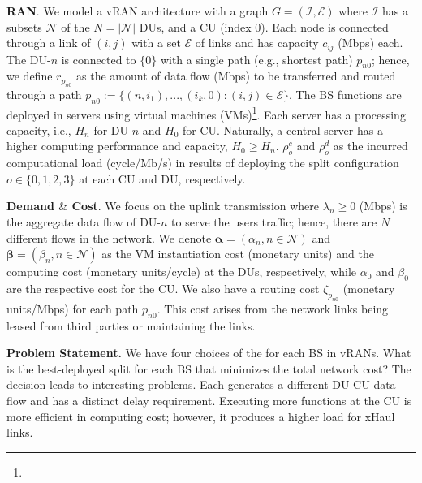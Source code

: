 \textbf{RAN}. We model a vRAN architecture with a graph $G = (\mathcal{I}, \mathcal{E})$ where $\mathcal{I}$ has a subsets $\mathcal{N}$ of the $N=|\mathcal{N}|$ DUs,  and a CU (index $0$). Each node is connected through a link of $(i,j)$ with a set $\mathcal{E}$ of links and has capacity $c_{ij}$ (Mbps) each. The DU-$n$ is connected to $\{0\}$ with a single path (e.g., shortest path) $p_{n0}$; hence, we define $r_{p_{n0}}$ as the amount of data flow (Mbps) to be transferred and routed through a path $p_{n0} \! := \!  \{(n,i_1), ..., (i_k,0) \! : \! (i,j) \! \in \! \mathcal{E} \}$. The BS functions are deployed in servers using virtual machines (VMs)\footnote{}. Each server has a processing capacity, i.e., $H_n$ for DU-$n$ and $H_0$ for CU. Naturally, a central server has a higher computing performance and capacity,  $H_0 \! \geq \! H_n$.  $\rho_{o}^c $ and $ \rho_{o}^d$ as the incurred computational load (cycle/Mb/s) in results of deploying the split configuration $o \! \in \! \{0,1,2,3\}$ at each CU and DU, respectively. %


\textbf{Demand $\&$ Cost}. We focus on the uplink transmission where $\lambda_{n} \geq 0$ (Mbps) is the aggregate data flow of DU-$n$ to serve the users traffic;
hence, there are $N$ different flows in the network. We denote $ \bm{\alpha} = (\alpha_n, n \in \mathcal{N})$ and $\bm{\beta} \!=\! (\beta_n, n \in \mathcal{N})$ as the VM instantiation cost (monetary units) and the computing cost (monetary units/cycle) at the DUs, respectively, while $\alpha_0$ and $\beta_0$ are the respective cost for the CU. We also have a routing cost $\zeta_{p_{n0}}$ (monetary units/Mbps) for each path $p_{n0}$. This cost arises from the network links being leased from third parties or maintaining the links. 

\textbf{Problem Statement.} We have four choices of the  for each BS in vRANs. What is the best-deployed split for each BS that minimizes the total network cost? The decision leads to interesting problems. Each  generates a different DU-CU data flow and has a distinct delay requirement. Executing more functions at the CU is more efficient in computing cost; however, it produces a higher load for xHaul links. 




